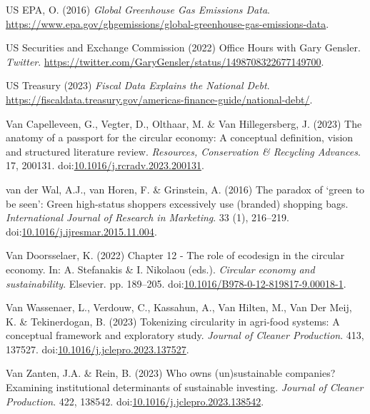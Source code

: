 \documentclass[
  letterpaper,
  DIV=11,
  numbers=noendperiod]{scrartcl}
\newlength{\cslhangindent}
\newenvironment{CSLReferences}[2] %
 {\begin{list}{}{%
  \setlength{\itemindent}{0pt}
  \setlength{\leftmargin}{0pt}
  \setlength{\parsep}{0pt}
  \ifodd #1
   \setlength{\leftmargin}{\cslhangindent}
   \setlength{\itemindent}{-1\cslhangindent}
  \fi
  \setlength{\itemsep}{#2\baselineskip}}}
 {\end{list}}
\begin{document}
\begin{CSLReferences}{0}{1}
US EPA, O. (2016) \emph{Global {Greenhouse Gas Emissions Data}}.
\url{https://www.epa.gov/ghgemissions/global-greenhouse-gas-emissions-data}.

US Securities and Exchange Commission (2022) Office {Hours} with {Gary
Gensler}. \emph{Twitter}.
\url{https://twitter.com/GaryGensler/status/1498708322677149700}.

US Treasury (2023) \emph{Fiscal {Data Explains} the {National Debt}}.
\url{https://fiscaldata.treasury.gov/americas-finance-guide/national-debt/}.

Van Capelleveen, G., Vegter, D., Olthaar, M. \& Van Hillegersberg, J.
(2023) The anatomy of a passport for the circular economy: A conceptual
definition, vision and structured literature review. \emph{Resources,
Conservation \& Recycling Advances}. 17, 200131.
doi:\href{https://doi.org/10.1016/j.rcradv.2023.200131}{10.1016/j.rcradv.2023.200131}.

van der Wal, A.J., van Horen, F. \& Grinstein, A. (2016) The paradox of
{`green to be seen'}: {Green} high-status shoppers excessively use
(branded) shopping bags. \emph{International Journal of Research in
Marketing}. 33 (1), 216--219.
doi:\href{https://doi.org/10.1016/j.ijresmar.2015.11.004}{10.1016/j.ijresmar.2015.11.004}.

Van Doorsselaer, K. (2022) Chapter 12 - {The} role of ecodesign in the
circular economy. In: A. Stefanakis \& I. Nikolaou (eds.).
\emph{Circular economy and sustainability}. Elsevier. pp. 189--205.
doi:\href{https://doi.org/10.1016/B978-0-12-819817-9.00018-1}{10.1016/B978-0-12-819817-9.00018-1}.

Van Wassenaer, L., Verdouw, C., Kassahun, A., Van Hilten, M., Van Der
Meij, K. \& Tekinerdogan, B. (2023) Tokenizing circularity in agri-food
systems: {A} conceptual framework and exploratory study. \emph{Journal
of Cleaner Production}. 413, 137527.
doi:\href{https://doi.org/10.1016/j.jclepro.2023.137527}{10.1016/j.jclepro.2023.137527}.

Van Zanten, J.A. \& Rein, B. (2023) Who owns (un)sustainable companies?
{Examining} institutional determinants of sustainable investing.
\emph{Journal of Cleaner Production}. 422, 138542.
doi:\href{https://doi.org/10.1016/j.jclepro.2023.138542}{10.1016/j.jclepro.2023.138542}.


\end{CSLReferences}
\end{document}
